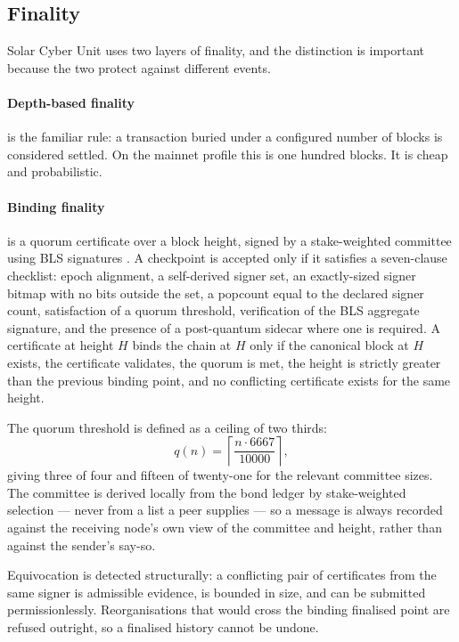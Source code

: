 \documentclass{article}
\begin{document}
\subsection{Finality}
\label{sec:finality}

Solar Cyber Unit uses two layers of finality, and the distinction is important because
the two protect against different events.

\paragraph{Depth-based finality} is the familiar rule: a transaction buried
under a configured number of blocks is considered settled. On the mainnet
profile this is one hundred blocks. It is cheap and probabilistic.

\paragraph{Binding finality} is a quorum certificate over a block height,
signed by a stake-weighted committee using BLS signatures
\cite{boneh2003aggregate,bls-signature2022}. A checkpoint is accepted only if
it satisfies a seven-clause checklist: epoch alignment, a self-derived signer
set, an exactly-sized signer bitmap with no bits outside the set, a popcount
equal to the declared signer count, satisfaction of a quorum threshold,
verification of the BLS aggregate signature, and the presence of a
post-quantum sidecar where one is required. A certificate at height $H$ binds
the chain at $H$ only if the canonical block at $H$ exists, the certificate
validates, the quorum is met, the height is strictly greater than the previous
binding point, and no conflicting certificate exists for the same height.

The quorum threshold is defined as a ceiling of two thirds:
\begin{equation}
q(n) = \left\lceil \frac{n \cdot 6667}{10000} \right\rceil ,
\label{eq:quorum}
\end{equation}
giving three of four and fifteen of twenty-one for the relevant committee
sizes. The committee is derived locally from the bond ledger by stake-weighted
selection --- never from a list a peer supplies --- so a message is always
recorded against the receiving node's own view of the committee and height,
rather than against the sender's say-so.

Equivocation is detected structurally: a conflicting pair of certificates from
the same signer is admissible evidence, is bounded in size, and can be
submitted permissionlessly. Reorganisations that would cross the binding
finalised point are refused outright, so a finalised history cannot be undone.
\end{document}
